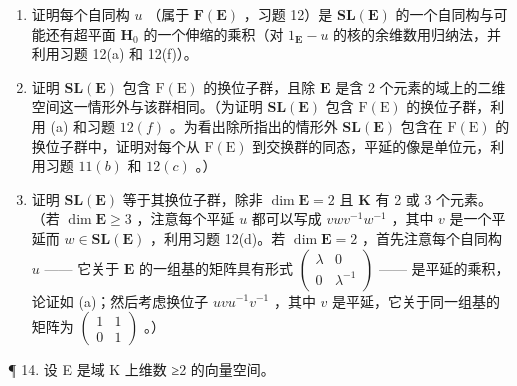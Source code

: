 \begin{enumerate}
\def\labelenumi{(\alph{enumi})}
\item
  证明每个自同构 \(u\) （属于 \(\mathbf{F}(\mathbf{E})\) ，习题 12）是 \(\mathbf{SL}(\mathbf{E})\) 的一个自同构与可能还有超平面 \(\mathbf{H}_0\) 的一个伸缩的乘积（对 \(1_{\mathbf{E}} - u\) 的核的余维数用归纳法，并利用习题 12(a) 和 12(f)）。
\item
  证明 \(\mathbf{SL}(\mathbf{E})\) 包含 \(\mathrm{F(E)}\) 的换位子群，且除 \(\mathbf{E}\) 是含 2 个元素的域上的二维空间这一情形外与该群相同。（为证明 \(\mathbf{SL}(\mathbf{E})\) 包含 \(\mathrm{F(E)}\) 的换位子群，利用 (a) 和习题 \(12(f)\) 。为看出除所指出的情形外 \(\mathbf{SL}(\mathbf{E})\) 包含在 \(\mathrm{F(E)}\) 的换位子群中，证明对每个从 \(\mathrm{F(E)}\) 到交换群的同态，平延的像是单位元，利用习题 \(11(b)\) 和 \(12(c)\) 。）
\item
  证明 \(\mathbf{SL}(\mathbf{E})\) 等于其换位子群，除非 \(\dim \mathbf{E} = 2\) 且 \(\mathbf{K}\) 有 2 或 3 个元素。（若 \(\dim \mathbf{E} \geqslant 3\) ，注意每个平延 \(u\) 都可以写成 \(vwv^{-1}w^{-1}\) ，其中 \(v\) 是一个平延而 \(w \in \mathbf{SL}(\mathbf{E})\) ，利用习题 12(d)。若 \(\dim \mathbf{E} = 2\) ，首先注意每个自同构 \(u\) —— 它关于 \(\mathbf{E}\) 的一组基的矩阵具有形式 \(\begin{pmatrix} \lambda & 0 \\ 0 & \lambda^{-1} \end{pmatrix}\) —— 是平延的乘积，论证如 (a)；然后考虑换位子 \(uvu^{-1}v^{-1}\) ，其中 \(v\) 是平延，它关于同一组基的矩阵为 \(\begin{pmatrix} 1 & 1 \\ 0 & 1 \end{pmatrix}\) 。）
\end{enumerate}

¶ 14. 设 E 是域 K 上维数 ≥2 的向量空间。

